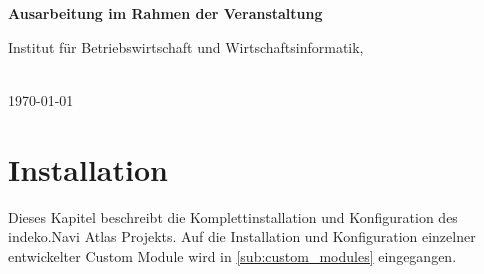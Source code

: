 \begin{titlepage}
\begin{figure}
\begin{minipage}{0.25\textwidth}
\begin{flushright}
        \end{flushright}
    \end{minipage}
    \vspace{4cm}
\end{figure}
\begin{center}

    \Huge{\textbf{\titel}}

    \Huge{\textbf{\untertitel}}
    \vspace{2cm}
\end{center}
\begin{center}
    \vspace*{0cm}
    \textbf{Ausarbeitung im Rahmen der Veranstaltung \veranstaltung}
    \vspace{1cm}
\end{center}
\begin{center}
    Institut für Betriebswirtschaft und Wirtschaftsinformatik,

    \arbeitsgruppe
\end{center}
\begin{center}
    \vspace{5cm}
    \autor\\


    \today
\end{center}
\end{titlepage}
\newpage


\tableofcontents

\newpage
\listoffigures
\thispagestyle{empty}

\glsaddall
{}
\printglossary[type=\acronymtype,title = Abkürzungsverzeichnis]

\newpage
\restoregeometry
{}




\section{Installation}
Dieses Kapitel beschreibt die Komplettinstallation und Konfiguration des \acrshort{indeko}.Navi Atlas Projekts. Auf die Installation und Konfiguration einzelner entwickelter Custom Module wird in \cref{sub:custom_modules} eingegangen.


